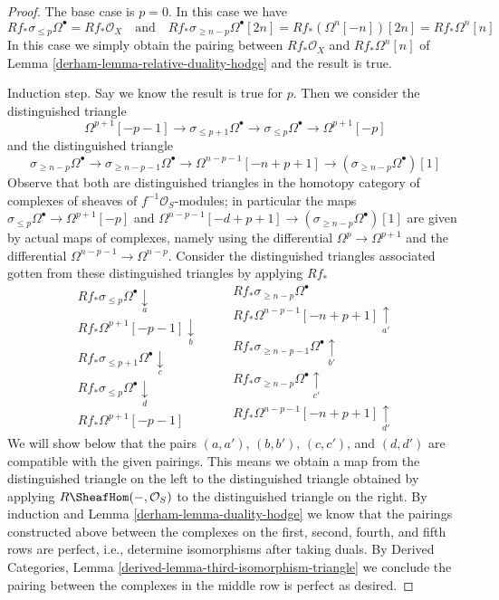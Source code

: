 \begin{proof}
\medskip\noindent
The base case is $p = 0$. In this case we have
$$
Rf_*\sigma_{\leq p}\Omega^\bullet = Rf_*\mathcal{O}_X
\quad\text{and}\quad
Rf_*\sigma_{\geq n - p}\Omega^\bullet[2n] = Rf_*(\Omega^n[-n])[2n] =
Rf_*\Omega^n[n]
$$
In this case we simply obtain the pairing
between $Rf_*\mathcal{O}_X$ and $Rf_*\Omega^n[n]$ of
Lemma \ref{derham-lemma-relative-duality-hodge} and the result is true.

\medskip\noindent
Induction step. Say we know the result is true for $p$. Then
we consider the distinguished triangle
$$
\Omega^{p + 1}[-p - 1] \to
\sigma_{\leq p + 1}\Omega^\bullet \to
\sigma_{\leq p}\Omega^\bullet \to
\Omega^{p + 1}[-p]
$$
and the distinguished triangle
$$
\sigma_{\geq n - p}\Omega^\bullet \to
\sigma_{\geq n - p - 1}\Omega^\bullet \to
\Omega^{n - p - 1}[-n + p + 1] \to
(\sigma_{\geq n - p}\Omega^\bullet)[1]
$$
Observe that both are distinguished triangles in the homotopy category
of complexes of sheaves of $f^{-1}\mathcal{O}_S$-modules; in particular the
maps $\sigma_{\leq p}\Omega^\bullet \to \Omega^{p + 1}[-p]$ and
$\Omega^{n - p - 1}[-d + p + 1] \to (\sigma_{\geq n - p}\Omega^\bullet)[1]$
are given by actual maps of complexes, namely using the differential
$\Omega^p \to \Omega^{p + 1}$ and the differential
$\Omega^{n - p - 1} \to \Omega^{n - p}$.
Consider the distinguished triangles associated gotten from these
distinguished triangles by applying $Rf_*$
$$
\begin{array}{c}Rf_*\sigma_{\leq p}\Omega^\bullet \underset{a}{\downarrow} \\ Rf_*\Omega^{p + 1}[-p - 1] \underset{b}{\downarrow} \\ Rf_*\sigma_{\leq p + 1}\Omega^\bullet \underset{c}{\downarrow} \\ Rf_*\sigma_{\leq p}\Omega^\bullet \underset{d}{\downarrow} \\ Rf_*\Omega^{p + 1}[-p - 1]\end{array}
\quad\quad
\begin{array}{c}Rf_*\sigma_{\geq n - p}\Omega^\bullet \\ Rf_*\Omega^{n - p - 1}[-n + p + 1] \underset{a'}{\uparrow} \\ Rf_*\sigma_{\geq n - p - 1}\Omega^\bullet \underset{b'}{\uparrow} \\ Rf_*\sigma_{\geq n - p}\Omega^\bullet \underset{c'}{\uparrow} \\ Rf_*\Omega^{n - p - 1}[-n + p + 1] \underset{d'}{\uparrow}\end{array}
$$
We will show below that the pairs $(a, a')$, $(b, b')$, $(c, c')$, and
$(d, d')$ are compatible with the given pairings. This means we obtain a
map from the distinguished triangle on the left to the distinguished triangle
obtained by applying $R\SheafHom(-, \mathcal{O}_S)$ to the distinguished
triangle on the right. By induction and Lemma \ref{derham-lemma-duality-hodge}
we know that the pairings constructed above between the
complexes on the first, second, fourth, and fifth
rows are perfect, i.e., determine isomorphisms after taking duals.
By Derived Categories, Lemma \ref{derived-lemma-third-isomorphism-triangle}
we conclude the pairing between the complexes in the middle row
is perfect as desired.


\end{proof}
